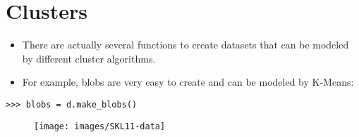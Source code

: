 \documentclass[SKL-MASTER.tex]{subfiles}
\begin{document}
\section*{Clusters}
\begin{itemize}
\item There are actually several functions to create datasets that can
be modeled by different cluster algorithms. \item For example, blobs are very easy to create and
can be modeled by K-Means:
\end{itemize}
\begin{framed}
	\begin{verbatim}
>>> blobs = d.make_blobs()
\end{verbatim}
\end{framed}
\begin{figure}[h!]
\centering
\texttt{[image: images/SKL11-data]}
\end{figure}
\end{document}
